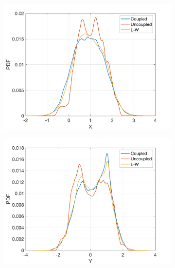 \documentclass[12pt]{article}
\begin{document}
\begin{figure}[H]
	\centering
	\begin{subfigure}[b]{0.3\textwidth}
		\centering
		\includegraphics[width=\textwidth]{plots/l84l63/pdf_x_1.png}
	\end{subfigure}
	\hfill
	\begin{subfigure}[b]{0.3\textwidth}
		\centering
		\includegraphics[width=\textwidth]{plots/l84l63/pdf_y_1.png}
	\end{subfigure}
	\hfill
	\begin{subfigure}[b]{0.3\textwidth}
		\centering

\end{subfigure}
\end{figure}
\end{document}
